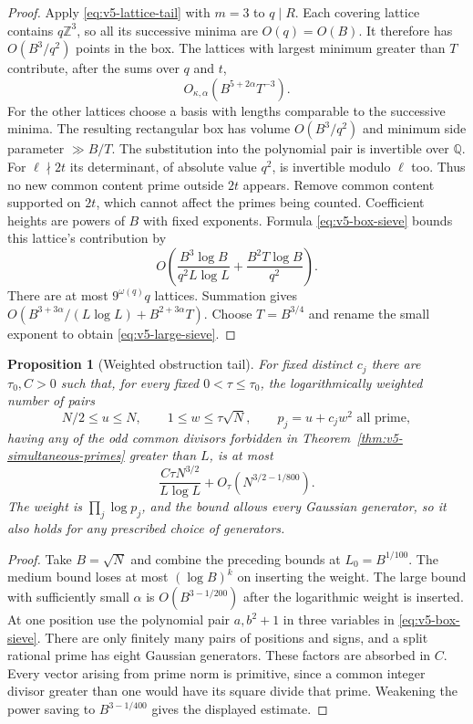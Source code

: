 \documentclass[11pt]{article}
\newtheorem{proposition}[theorem]{Proposition}
\theoremstyle{definition}
\theoremstyle{remark}
\begin{document}
\begin{proof}
Apply \eqref{eq:v5-lattice-tail} with $m=3$ to $q\mid R$.
Each covering lattice contains $q\mathbb Z^3$, so all its successive minima
are $O(q)=O(B)$. It therefore has $O(B^3/q^2)$ points in the box.
The lattices with largest minimum greater than $T$ contribute, after the
sums over $q$ and $t$,
\[
 O_{\kappa,\alpha}(B^{5+2\alpha}T^{-3}).
\]
For the other lattices choose a basis with lengths comparable to the
successive minima. The resulting rectangular box has volume $O(B^3/q^2)$
and minimum side parameter $\gg B/T$.
The substitution into the polynomial pair is invertible over $\mathbb Q$.
For $\ell\nmid2t$ its determinant, of absolute value $q^2$, is invertible
modulo $\ell$ too. Thus no new common content prime outside $2t$ appears.
Remove common content supported on $2t$, which cannot affect the primes
being counted. Coefficient heights are powers of $B$ with fixed exponents.
Formula \eqref{eq:v5-box-sieve} bounds this lattice's contribution by
\[
 O\left(\frac{B^3\log B}{q^2L\log L}
                 +\frac{B^2T\log B}{q^2}\right).
\]
There are at most $9^{\omega(q)}q$ lattices. Summation gives
$O(B^{3+3\alpha}/(L\log L)+B^{2+3\alpha}T)$.
Choose $T=B^{3/4}$ and rename the small exponent to obtain
\eqref{eq:v5-large-sieve}.
\end{proof}

\begin{proposition}[Weighted obstruction tail]\label{prop:v5-obstruction-tail}
For fixed distinct $c_j$ there are $\tau_0,C>0$ such that, for every fixed
$0<\tau\leq\tau_0$, the logarithmically weighted number of pairs
\[
 N/2\leq u\leq N,\qquad 1\leq w\leq\tau\sqrt N,
 \qquad p_j=u+c_jw^2\text{ all prime},
\]
having any of the odd common divisors forbidden in
Theorem~\ref{thm:v5-simultaneous-primes} greater than $L$, is at most
\begin{equation}\label{eq:v5-obstruction-tail}
 \frac{C\tau N^{3/2}}{L\log L}
       +O_\tau(N^{3/2-1/800}).
\end{equation}
The weight is $\prod_j\log p_j$, and the bound allows every Gaussian
generator, so it also holds for any prescribed choice of generators.
\end{proposition}
\begin{proof}
Take $B=\sqrt N$ and combine the preceding bounds at $L_0=B^{1/100}$.
The medium bound loses at most $(\log B)^k$ on inserting the weight.
The large bound with sufficiently small $\alpha$ is
$O(B^{3-1/200})$ after the logarithmic weight is inserted.
At one position use the polynomial pair $a,b^2+1$ in three variables
in \eqref{eq:v5-box-sieve}.
There are only finitely many pairs of positions and signs, and a split
rational prime has eight Gaussian generators. These factors are absorbed
in $C$. Every vector arising from prime norm is primitive, since a common
integer divisor greater than one would have its square divide that prime.
Weakening the power saving to $B^{3-1/400}$ gives the displayed estimate.
\end{proof}
\end{document}

